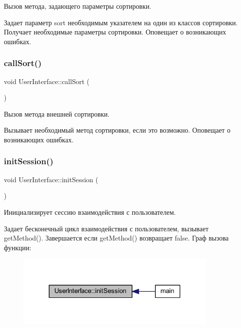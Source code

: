 Вызов метода, задающего параметры сортировки. 

Задает параметр sort необходимым указателем на один из классов сортировки. Получает необходимые параметры сортировки. Оповещает о возникающих ошибках. \hypertarget{class_user_interface_a0e03dfecee7e890ad1e076888062d5cb}{}\label{class_user_interface_a0e03dfecee7e890ad1e076888062d5cb} 
\subsubsection{\texorpdfstring{call\+Sort()}{callSort()}}
{\footnotesize\ttfamily void User\+Interface\+::call\+Sort (\begin{DoxyParamCaption}{ }\end{DoxyParamCaption})\hspace{0.3cm}{\ttfamily [private]}}



Вызов метода внешней сортировки. 

Вызывает необходимый метод сортировки, если это возможно. Оповещает о возникающих ошибках. \hypertarget{class_user_interface_a6c7f9ef9faa40eaf4760d57e89228786}{}\label{class_user_interface_a6c7f9ef9faa40eaf4760d57e89228786} 
\subsubsection{\texorpdfstring{init\+Session()}{initSession()}}
{\footnotesize\ttfamily void User\+Interface\+::init\+Session (\begin{DoxyParamCaption}{ }\end{DoxyParamCaption})}



Инициализирует сессию взаимодействия с пользователем. 

Задает бесконечный цикл взаимодействия с пользователем, вызывает get\+Method(). Завершается если get\+Method() возвращает false. Граф вызова функции\+:\nopagebreak
\begin{figure}[H]
\begin{center}
\leavevmode
\includegraphics[width=282pt]{class_user_interface_a6c7f9ef9faa40eaf4760d57e89228786_icgraph}
\end{center}
\end{figure}
\hypertarget{class_user_interface_a595a469d83a351719c75c65fbf4a6fbe}{}\label{class_user_interface_a595a469d83a351719c75c65fbf4a6fbe} 
